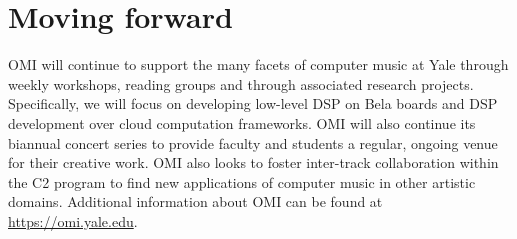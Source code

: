 \section{Moving forward}

OMI will continue to support the many facets of computer music at Yale through weekly workshops, reading groups and through associated research projects. Specifically, we will focus on developing low-level DSP on Bela boards and DSP development over cloud computation frameworks. OMI will also continue its biannual concert series to provide faculty and students a regular, ongoing venue for their creative work. OMI also looks to foster inter-track collaboration within the C2 program to find new applications of computer music in other artistic domains. Additional information about OMI can be found at \url{https://omi.yale.edu}.
